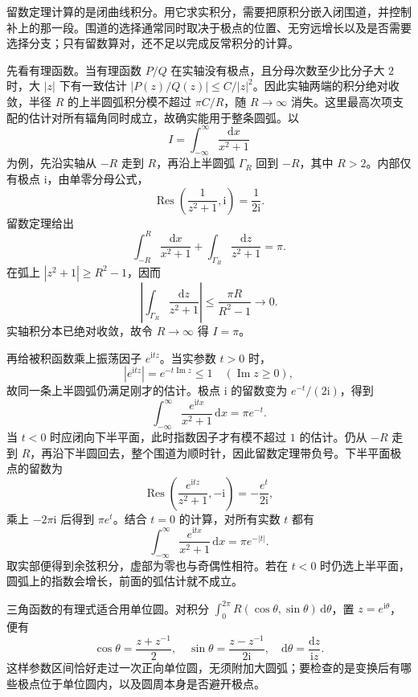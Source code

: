 留数定理计算的是闭曲线积分。用它求实积分，需要把原积分嵌入闭围道，并控制补上的那一段。围道的选择通常同时取决于极点的位置、无穷远增长以及是否需要选择分支；只有留数算对，还不足以完成反常积分的计算。

\ProseParagraphBreak

先看有理函数。当有理函数 \(P/Q\) 在实轴没有极点，且分母次数至少比分子大 \(2\) 时，大 \(|z|\) 下有一致估计 \(|P(z)/Q(z)|\le C/|z|^2\)。因此实轴两端的积分绝对收敛，半径 \(R\) 的上半圆弧积分模不超过 \(\pi C/R\)，随 \(R\to\infty\) 消失。这里最高次项支配的估计对所有辐角同时成立，故确实能用于整条圆弧。以
\[
 I=\int_{-\infty}^{\infty}\frac{\mathrm{d}x}{x^2+1}
\]
为例，先沿实轴从 \(-R\) 走到 \(R\)，再沿上半圆弧 \(\Gamma_R\) 回到 \(-R\)，其中 \(R>2\)。内部仅有极点 \(\mathrm{i}\)，由单零分母公式，
\[
 \operatorname{Res}\left(\frac1{z^2+1},\mathrm{i}\right)
 =\frac1{2\mathrm{i}}.
\]
留数定理给出
\[
 \int_{-R}^{R}\frac{\mathrm{d}x}{x^2+1}
 +\int_{\Gamma_R}\frac{\mathrm{d}z}{z^2+1}=\pi.
\]
在弧上 \(|z^2+1|\ge R^2-1\)，因而
\[
 \left|\int_{\Gamma_R}\frac{\mathrm{d}z}{z^2+1}\right|
 \le\frac{\pi R}{R^2-1}\longrightarrow0.
\]
实轴积分本已绝对收敛，故令 \(R\to\infty\) 得 \(I=\pi\)。

\ProseParagraphBreak

再给被积函数乘上振荡因子 \(e^{\mathrm{i}tz}\)。当实参数 \(t>0\) 时，
\[
 |e^{\mathrm{i}tz}|=e^{-t\operatorname{Im}z}\le1
 \quad(\operatorname{Im}z\ge0),
\]
故同一条上半圆弧仍满足刚才的估计。极点 \(\mathrm{i}\) 的留数变为 \(e^{-t}/(2\mathrm{i})\)，得到
\[
 \int_{-\infty}^{\infty}\frac{e^{\mathrm{i}tx}}{x^2+1}\,\mathrm{d}x=\pi e^{-t}.
\]
当 \(t<0\) 时应闭向下半平面，此时指数因子才有模不超过 \(1\) 的估计。仍从 \(-R\) 走到 \(R\)，再沿下半圆回去，整个围道为顺时针，因此留数定理带负号。下半平面极点的留数为
\[
 \operatorname{Res}\left(\frac{e^{\mathrm{i}tz}}{z^2+1},-\mathrm{i}\right)
 =-\frac{e^t}{2\mathrm{i}},
\]
乘上 \(-2\pi\mathrm{i}\) 后得到 \(\pi e^t\)。结合 \(t=0\) 的计算，对所有实数 \(t\) 都有
\[
 \int_{-\infty}^{\infty}\frac{e^{\mathrm{i}tx}}{x^2+1}\,\mathrm{d}x
 =\pi e^{-|t|}.
\]
取实部便得到余弦积分，虚部为零也与奇偶性相符。若在 \(t<0\) 时仍选上半平面，圆弧上的指数会增长，前面的弧估计就不成立。

\ProseParagraphBreak

三角函数的有理式适合用单位圆。对积分
\(\int_0^{2\pi}R(\cos\theta,\sin\theta)\,\mathrm{d}\theta\)，置 \(z=e^{\mathrm{i}\theta}\)，便有
\[
 \cos\theta=\frac{z+z^{-1}}2,\quad
 \sin\theta=\frac{z-z^{-1}}{2\mathrm{i}},\quad
 \mathrm{d}\theta=\frac{\mathrm{d}z}{\mathrm{i}z}.
\]
这样参数区间恰好走过一次正向单位圆，无须附加大圆弧；要检查的是变换后有哪些极点位于单位圆内，以及圆周本身是否避开极点。

